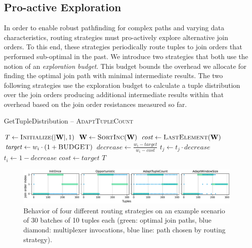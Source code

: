 \subsection{Pro-active Exploration}

In order to enable robust pathfinding for complex paths and varying data characteristics, routing strategies must pro-actively explore alternative join orders. To this end, these strategies periodically route tuples to join orders that performed sub-optimal in the past. We introduce two strategies that both use the notion of an \textit{exploration budget}. This budget bounds the overhead we allocate for finding the optimal join path with minimal intermediate results. The two following strategies use the exploration budget to calculate a tuple distribution over the join orders producing additional intermediate results within that overhead based on the join order resistances measured so far.

\begin{algorithm}[!t]
\caption{GetTupleDistribution -- \textsc{AdaptTupleCount}}\label{alg:adapt_tuple_count}
\begin{algorithmic}[1]
\State $T \gets \textsc{Initialize}(\lvert \mathbf{W}\rvert, 1)$
\State $\mathbf{W} \gets \textsc{SortInc}(\mathbf{W})$
\State $\mathit{cost} \gets \textsc{LastElement}(\mathbf{W})$
    \State $\mathit{target} \gets w_i \cdot (1 + \textsc{BUDGET})$
    \State $\mathit{decrease} \gets \frac{w_i - \mathit{target}}{w_i - \mathit{cost}}$
        \State $t_j \gets t_j \cdot \mathit{decrease}$
    \EndFor
    \State $t_i \gets 1 - \mathit{decrease}$
    \State $\mathit{cost} \gets \mathit{target}$
\EndFor
\State\Return $T$
\end{algorithmic}
\end{algorithm}

\begin{figure}[!t]
    \centering
    \includegraphics[width=\linewidth]{figures/routing_example.pdf}
    \caption{Behavior of four different routing strategies on an example scenario of 30 batches of 10 tuples each (green: optimal join paths, blue diamond: multiplexer invocations, blue line: path chosen by routing strategy).}
    \label{fig:routing_example}
\end{figure}

